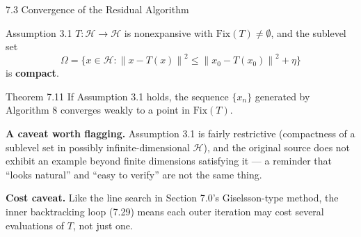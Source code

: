 \documentclass[aspectratio=169,10pt]{beamer}
\newcommand{\mHH}{\mathcal H}
\newcommand{\norm}[1]{\left\|#1\right\|}
\newcommand{\Fix}{\mathrm{Fix}}
\begin{document}
\begin{frame}{7.3 Convergence of the Residual Algorithm}

  \begin{block}{Assumption 3.1}
    $T:\mHH\to\mHH$ is nonexpansive with $\Fix(T)\neq\emptyset$, and
    the sublevel set
    \[
      \Omega=\bigl\{x\in\mHH:\norm{x-T(x)}^2\le\norm{x_0-T(x_0)}^2+\eta\bigr\}
    \]
    is \textbf{compact}.
  \end{block}

  \begin{alertblock}{Theorem 7.11}
    If Assumption 3.1 holds, the sequence $\{x_n\}$ generated by
    Algorithm 8 converges weakly to a point in $\Fix(T)$.
  \end{alertblock}

  \textbf{A caveat worth flagging.} Assumption 3.1 is fairly
  restrictive (compactness of a sublevel set in possibly
  infinite-dimensional $\mHH$), and the original source does not
  exhibit an example beyond finite dimensions satisfying it ---
  a reminder that ``looks natural'' and ``easy to verify'' are not
  the same thing.

  \textbf{Cost caveat.} Like the line search in Section 7.0's
  Giselsson-type method, the inner backtracking loop (7.29) means
  each outer iteration may cost several evaluations of $T$, not
  just one.

\end{frame}
\end{document}
